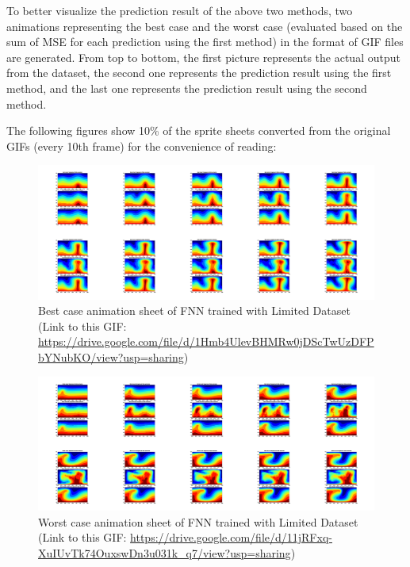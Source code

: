 To better visualize the prediction result of the above two methods, two animations representing the best case and the worst case (evaluated based on the sum of MSE for each prediction using the first method) in the format of GIF files are generated. From top to bottom, the first picture represents the actual output from the dataset, the second one represents the prediction result using the first method, and the last one represents the prediction result using the second method.

The following figures show 10\% of the sprite sheets converted from the original GIFs (every 10th frame) for the convenience of reading:

\begin{figure}[H]
    \centering
    \caption{Best case animation sheet of FNN trained with Limited Dataset (Link to this GIF: \url{https://drive.google.com/file/d/1Hmb4UlevBHMRw0jDScTwUzDFPbYNubKO/view?usp=sharing})}
    \includegraphics[scale=0.10]{figures/mantle_convection_images/limited_dataset/FNN_Best_GIF_sheet.png}
\end{figure}

\begin{figure}[H]
    \centering
    \caption{Worst case animation sheet of FNN trained with Limited Dataset (Link to this GIF: 
    \url{https://drive.google.com/file/d/11jRFxq-XuIUvTk74OuxswDn3u031k_q7/view?usp=sharing})}
    \includegraphics[scale=0.10]{figures/mantle_convection_images/limited_dataset/FNN_Worst_GIF_sheet.png}
\end{figure}

